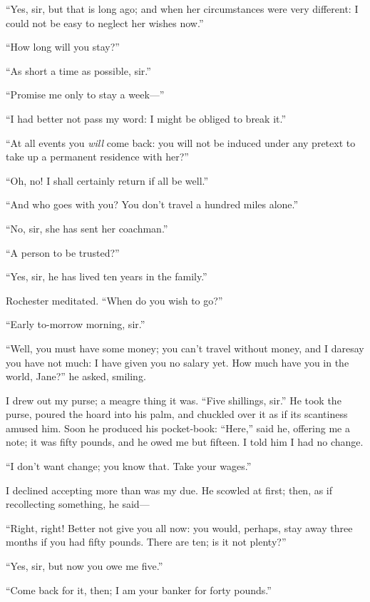 \enquote{Yes, sir, but that is long ago; and when her circumstances were
very different: I could not be easy to neglect her wishes now.}

\enquote{How long will you stay?}

\enquote{As short a time as possible, sir.}

\enquote{Promise me only to stay a week---}

\enquote{I had better not pass my word: I might be obliged to break it.}

\enquote{At all events you \emph{will} come back: you will not be induced under
any pretext to take up a permanent residence with her?}

\enquote{Oh, no! I shall certainly return if all be well.}

\enquote{And who goes with you? You don't travel a hundred miles
alone.}

\enquote{No, sir, she has sent her coachman.}

\enquote{A person to be trusted?}

\enquote{Yes, sir, he has lived ten years in the family.}

\Mr{} Rochester meditated. \enquote{When do you wish to go?}

\enquote{Early to-morrow morning, sir.}

\enquote{Well, you must have some money; you can't travel without money,
and I daresay you have not much: I have given you no salary yet. How
much have you in the world, Jane?} he asked, smiling.

I drew out my purse; a meagre thing it was. \enquote{Five shillings,
sir.} He took the purse, poured the hoard into his palm, and chuckled
over it as if its scantiness amused him. Soon he produced his
pocket-book: \enquote{Here,} said he, offering me a note; it was fifty
pounds, and he owed me but fifteen. I told him I had no change.

\enquote{I don't want change; you know that. Take your wages.}

I declined accepting more than was my due. He scowled at first; then,
as if recollecting something, he said---

\enquote{Right, right! Better not give you all now: you would, perhaps,
stay away three months if you had fifty pounds. There are ten; is it
not plenty?}

\enquote{Yes, sir, but now you owe me five.}

\enquote{Come back for it, then; I am your banker for forty pounds.}

